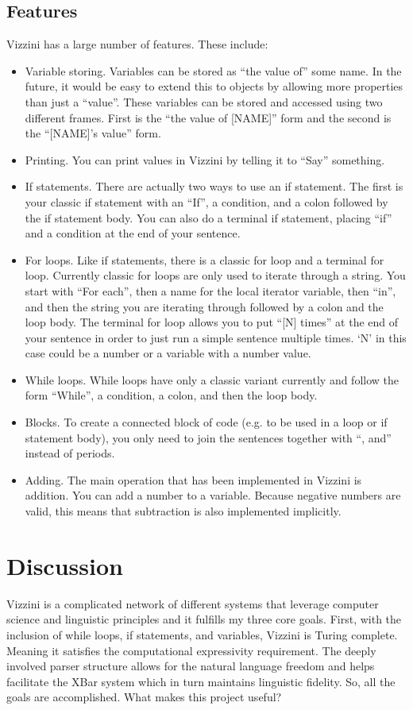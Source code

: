 \documentclass[titlepage]{article}
\newcommand{\langName}{Vizzini}
\begin{document}
\subsection*{Features}
\langName{} has a large number of features. These include:
\begin{itemize}
	\item Variable storing. Variables can be stored as ``the value of'' some name. In the future, it would be easy to extend this to objects by allowing more properties than just a ``value''. These variables can be stored and accessed using two different frames. First is the ``the value of [NAME]'' form and the second is the ``[NAME]'s value'' form.
	\item Printing. You can print values in \langName{} by telling it to ``Say'' something.
	\item If statements. There are actually two ways to use an if statement. The first is your classic if statement with an ``If'', a condition, and a colon followed by the if statement body. You can also do a terminal if statement, placing ``if'' and a condition at the end of your sentence.
	\item For loops. Like if statements, there is a classic for loop and a terminal for loop. Currently classic for loops are only used to iterate through a string. You start with ``For each'', then a name for the local iterator variable, then ``in'', and then the string you are iterating through followed by a colon and the loop body. The terminal for loop allows you to put ``[N] times'' at the end of your sentence in order to just run a simple sentence multiple times. `N' in this case could be a number or a variable with a number value.
	\item While loops. While loops have only a classic variant currently and follow the form ``While'', a condition, a colon, and then the loop body.
	\item Blocks. To create a connected block of code (e.g. to be used in a loop or if statement body), you only need to join the sentences together with ``, and'' instead of periods.
	\item Adding. The main operation that has been implemented in \langName{} is addition. You can add a number to a variable. Because negative numbers are valid, this means that subtraction is also implemented implicitly.
\end{itemize}

\newpage{}
\section*{Discussion}
\langName{} is a complicated network of different systems that leverage computer science and linguistic principles and it fulfills my three core goals. First, with the inclusion of while loops, if statements, and variables, \langName{} is Turing complete. Meaning it satisfies the computational expressivity requirement. The deeply involved parser structure allows for the natural language freedom and helps facilitate the XBar system which in turn maintains linguistic fidelity. So, all the goals are accomplished. What makes this project useful?
\end{document}
